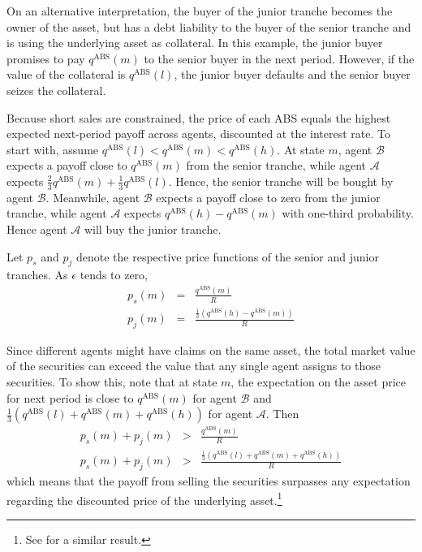 \documentclass[11pt]{article}
\theoremstyle{plain}
\begin{document}
On an alternative interpretation, the buyer of the junior tranche becomes the owner of the asset, but has a debt liability to the buyer of the senior tranche and is using the underlying asset as collateral. In this example, the junior buyer promises to pay $q^{\mathrm{ABS}}(m)$ to the senior buyer in the next period. However, if the value of the collateral is $q^{\mathrm{ABS}}(l)$, the junior buyer defaults and the senior buyer seizes the collateral.

Because short sales are constrained, the price of each ABS equals the highest expected next-period payoff across agents, discounted at the interest rate. To start with, assume $q^{\mathrm{ABS}}(l)<q^{\mathrm{ABS}}(m)<q^{\mathrm{ABS}}(h)$. At state $m$, agent $\mathcal{B}$ expects a payoff close to $q^{\mathrm{ABS}}(m)$ from the senior tranche, while agent $\mathcal{A}$ expects $\frac{2}{3}q^{\mathrm{ABS}}(m)+\frac{1}{3}q^{\mathrm{ABS}}(l)$. Hence, the senior tranche will be bought by agent $\mathcal{B}$. Meanwhile, agent $\mathcal{B}$ expects a payoff close to zero from the junior tranche, while agent $\mathcal{A}$ expects $q^{\mathrm{ABS}}(h)-q^{\mathrm{ABS}}(m)$ with one-third probability. Hence agent $\mathcal{A}$ will buy the junior tranche.

Let $p_s$ and $p_j$ denote the respective price functions of the senior and junior tranches. As $\epsilon$ tends to zero,
\begin{eqnarray*}
p_s(m) & = & \frac{q^{\mathrm{ABS}}(m)}{R} \\
p_j(m) & = & \frac{\frac{1}{3}\left(q^{\mathrm{ABS}}(h)-q^{\mathrm{ABS}}(m)\right)}{R}
\end{eqnarray*}

Since different agents might have claims on the same asset, the total market value of the securities can exceed the value that any single agent assigns to those securities. To show this, note that at state $m$, the expectation on the asset price for next period is close to $q^{\mathrm{ABS}}(m)$ for agent $\mathcal{B}$ and $\frac{1}{3}(q^{\mathrm{ABS}}(l)+q^{\mathrm{ABS}}(m)+q^{\mathrm{ABS}}(h))$ for agent $\mathcal{A}$. Then
\begin{eqnarray*}
p_s(m) + p_j(m) & > &  \frac{q^{\mathrm{ABS}}(m)}{R}  \\
p_s(m) + p_j(m) & > &  \frac{\frac{1}{3}\left(q^{\mathrm{ABS}}(l)+q^{\mathrm{ABS}}(m)+q^{\mathrm{ABS}}(h)\right)}{R}
\end{eqnarray*}
which means that the payoff from selling the securities surpasses any expectation regarding the discounted price of the underlying asset.\footnote{See \cite{FostelGeanakoplos2012} for a similar result.}
\end{document}
